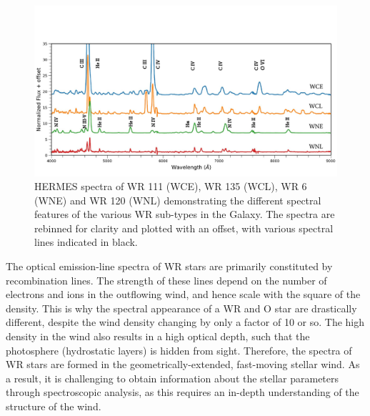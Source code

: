 \begin{figure}
    \centering
    \includegraphics[width=\textwidth]{chapters/introduction/image/Obs_SpT.pdf}
    \caption{HERMES spectra of WR 111 (WCE), WR 135 (WCL), WR 6 (WNE) and WR 120 (WNL) demonstrating the different spectral features of the various WR sub-types in the Galaxy. The spectra are rebinned for clarity and plotted with an offset, with various spectral lines indicated in black.}
    \label{fig:spectypes}
\end{figure}

The optical emission-line spectra of WR stars are primarily constituted by recombination lines. The strength of these lines depend on the number of electrons and ions in the outflowing wind, and hence scale with the square of the density. This is why the spectral appearance of a WR and O star are drastically different, despite the wind density changing by only a factor of 10 or so. The high density in the wind also results in a high optical depth, such that the photosphere (hydrostatic layers) is hidden from sight. Therefore, the spectra of WR stars are formed in the geometrically-extended, fast-moving stellar wind. As a result, it is challenging to obtain information about the stellar parameters through spectroscopic analysis, as this requires an in-depth understanding of the structure of the wind. 

